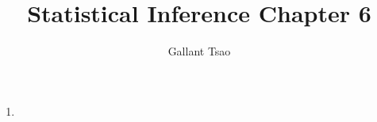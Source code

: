\documentclass{article}
\title{Statistical Inference Chapter 6}
\author{Gallant Tsao}
\begin{document}
\maketitle

\begin{enumerate}
    \item 
\end{enumerate}
\end{document}
